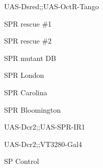 \documentclass[17pt]{extarticle}
\begin{document}
\footnotesize
\newpage\vspace*{-0.15cm}
\begin{footnotesize}
UAS-Dsred;;UAS-OctR-Tango \\[0.5em]
\end{footnotesize}
\footnotesize
\newpage\vspace*{-0.15cm}
\begin{normalsize}
SPR rescue \#1 \\[0.5em]
\end{normalsize}
\footnotesize
\newpage\vspace*{-0.15cm}
\begin{normalsize}
SPR rescue \#2 \\[0.5em]
\end{normalsize}
\footnotesize
\newpage\vspace*{-0.15cm}
\begin{normalsize}
SPR mutant DB \\[0.5em]
\end{normalsize}
\footnotesize
\newpage\vspace*{-0.15cm}
\begin{large}
SPR London \\[0.5em]
\end{large}
\footnotesize
\newpage\vspace*{-0.15cm}
\begin{normalsize}
SPR Carolina \\[0.5em]
\end{normalsize}
\footnotesize
\newpage\vspace*{-0.15cm}
\begin{normalsize}
SPR Bloomington \\[0.5em]
\end{normalsize}
\footnotesize
\newpage\vspace*{-0.15cm}
\begin{footnotesize}
UAS-Dcr2;;UAS-SPR-IR1 \\[0.5em]
\end{footnotesize}
\footnotesize
\newpage\vspace*{-0.15cm}
\begin{footnotesize}
UAS-Dcr2;;VT3280-Gal4 \\[0.5em]
\end{footnotesize}
\footnotesize
\newpage\vspace*{-0.15cm}
\begin{large}
SP Control \\[0.5em]
\end{large}
\end{document}
